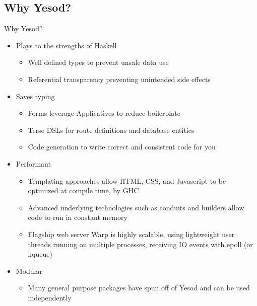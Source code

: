 \documentclass[pdf]{beamer}
\begin{document}
\subsection{Why Yesod?}
\begin{frame}{Why Yesod?}
  \begin{itemize}
  \item<1-> Plays to the strengths of Haskell
    \begin{itemize}
    \item Well defined types to prevent unsafe data use
    \item Referential transparency preventing unintended side effects
    \end{itemize}
  \item<2-> Saves typing
    \begin{itemize}
    \item Forms leverage Applicatives to reduce boilerplate
    \item Terse DSLs for route definitions and database entities
    \item Code generation to write correct and consistent code for you
    \end{itemize}
  \item<3-> Performant
    \begin{itemize}
    \item Templating approaches allow HTML, CSS, and Javascript to be
      optimized at compile time, by GHC
    \item Advanced underlying technologies such as conduits and
      builders allow code to run in constant memory
    \item Flagship web server Warp is highly scalable, using
      lightweight user threads running on multiple processes,
      receiving IO events with epoll (or kqueue)
    \end{itemize}
  \item<4-> Modular
    \begin{itemize}
    \item Many general purpose packages have spun off of Yesod and can
      be used independently
    \end{itemize}
  \end{itemize}
\end{frame}
\end{document}
